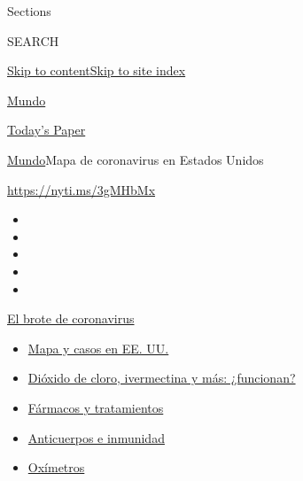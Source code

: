 Sections

SEARCH

\protect\hyperlink{site-content}{Skip to
content}\protect\hyperlink{site-index}{Skip to site index}

\href{https://www.nytimes3xbfgragh.onion/es/section/mundo}{Mundo}

\href{https://myaccount.nytimes3xbfgragh.onion/auth/login?response_type=cookie\&client_id=vi}{}

\href{https://www.nytimes3xbfgragh.onion/section/todayspaper}{Today's
Paper}

\href{/es/section/mundo}{Mundo}\textbar{}Mapa de coronavirus en Estados
Unidos

\url{https://nyti.ms/3gMHbMx}

\begin{itemize}
\item
\item
\item
\item
\item
\end{itemize}

\href{https://www.nytimes3xbfgragh.onion/es/spotlight/coronavirus?action=click\&pgtype=Article\&state=default\&region=TOP_BANNER\&context=storylines_menu}{El
brote de coronavirus}

\begin{itemize}
\tightlist
\item
  \href{https://www.nytimes3xbfgragh.onion/es/interactive/2020/espanol/mundo/coronavirus-en-estados-unidos.html?action=click\&pgtype=Article\&state=default\&region=TOP_BANNER\&context=storylines_menu}{Mapa
  y casos en EE. UU.}
\item
  \href{https://www.nytimes3xbfgragh.onion/es/2020/07/23/espanol/america-latina/bolivia-cloro-coronavirus-ivermectina.html?action=click\&pgtype=Article\&state=default\&region=TOP_BANNER\&context=storylines_menu}{Dióxido
  de cloro, ivermectina y más: ¿funcionan?}
\item
  \href{https://www.nytimes3xbfgragh.onion/es/interactive/2020/science/coronavirus-tratamientos-curas.html?action=click\&pgtype=Article\&state=default\&region=TOP_BANNER\&context=storylines_menu}{Fármacos
  y tratamientos}
\item
  \href{https://www.nytimes3xbfgragh.onion/es/2020/07/28/espanol/ciencia-y-tecnologia/anticuerpos-coronavirus-inmunidad.html?action=click\&pgtype=Article\&state=default\&region=TOP_BANNER\&context=storylines_menu}{Anticuerpos
  e inmunidad}
\item
  \href{https://www.nytimes3xbfgragh.onion/es/2020/04/29/espanol/estilos-de-vida/oximetro-para-que-sirve.html?action=click\&pgtype=Article\&state=default\&region=TOP_BANNER\&context=storylines_menu}{Oxímetros}
\end{itemize}

